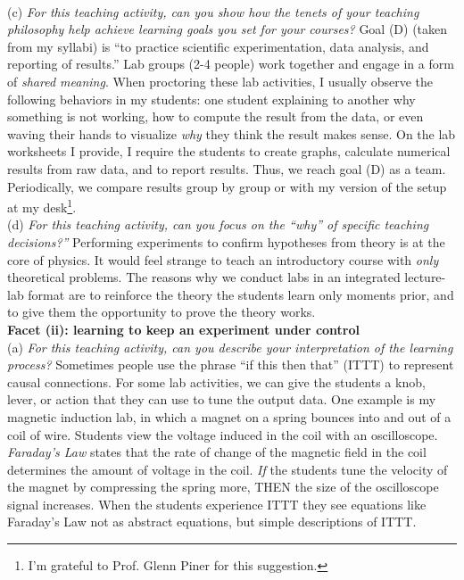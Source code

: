 \documentclass[../../../main.tex]{subfiles}
\begin{document}
\\
\vspace{0.15cm}
(c) \textit{For this teaching activity, can you show how the tenets of your teaching philosophy help achieve learning goals you set for your courses?}  Goal (D) (taken from my syllabi) is ``to practice scientific experimentation, data analysis, and reporting of results.''  Lab groups (2-4 people) work together and engage in a form of \textit{shared meaning}.  When proctoring these lab activities, I usually observe the following behaviors in my students: one student explaining to another why something is not working, how to compute the result from the data, or even waving their hands to visualize \textit{why} they think the result makes sense.  On the lab worksheets I provide, I require the students to create graphs, calculate numerical results from raw data, and to report results.  Thus, we reach goal (D) as a team.  Periodically, we compare results group by group or with my version of the setup at my desk\footnote{I'm grateful to Prof. Glenn Piner for this suggestion.}.
\\
\vspace{0.15cm}
(d) \textit{For this teaching activity, can you focus on the ``why'' of specific teaching decisions?''}  Performing experiments to confirm hypotheses from theory is at the core of physics.  It would feel strange to teach an introductory course with \textit{only} theoretical problems.  The reasons why we conduct labs in an integrated lecture-lab format are to reinforce the theory the students learn only moments prior, and to give them the opportunity to prove the theory works.
\\
\vspace{0.15cm}
\textbf{Facet (ii): learning to keep an experiment under control}
\\
\vspace{0.15cm}
(a) \textit{For this teaching activity, can you describe your interpretation of the learning process?}  Sometimes people use the phrase ``if this then that'' (ITTT) to represent causal connections.  For some lab activities, we can give the students a knob, lever, or action that they can use to tune the output data.  One example is my magnetic induction lab, in which a magnet on a spring bounces into and out of a coil of wire.  Students view the voltage induced in the coil with an oscilloscope.  \textit{Faraday's Law} states that the rate of change of the magnetic field in the coil determines the amount of voltage in the coil.  \textit{If} the students tune the velocity of the magnet by compressing the spring more, THEN the size of the oscilloscope signal increases.  When the students experience ITTT they see equations like Faraday's Law not as abstract equations, but simple descriptions of ITTT.
\end{document}
